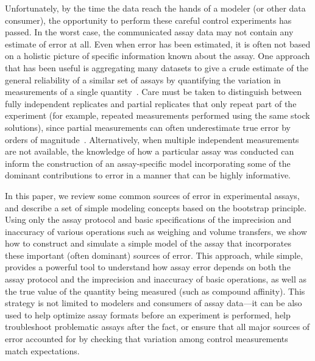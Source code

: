 \documentclass[aps,pre,twocolumn,nofootinbib,superscriptaddress,linenumbers]{revtex4-1}
\begin{document}
Unfortunately, by the time the data reach the hands of a modeler (or other data consumer), the opportunity to perform these careful control experiments has passed.
In the worst case, the communicated assay data may not contain any estimate of error at all. 
Even when error has been estimated, it is often not based on a holistic picture of specific information known about the assay.
One approach that has been useful is aggregating many datasets to give a crude estimate of the general reliability of a similar set of assays by quantifying the variation in measurements of a single quantity~\cite{kramer_experimental_2012,kalliokoski_comparability_2013}. 
Care must be taken to distinguish between fully independent replicates and partial replicates that only repeat part of the experiment (for example, repeated measurements performed using the same stock solutions), since partial measurements can often underestimate true error by orders of magnitude~\cite{chodera_entropy-enthalpy_2013}.
Alternatively, when multiple independent measurements are not available, the knowledge of how a particular assay was conducted can inform the construction of an assay-specific model incorporating some of the dominant contributions to error in a manner that can be highly informative.

In this paper, we review some common sources of error in experimental assays, and describe a set of simple modeling concepts based on the bootstrap principle.
Using only the assay protocol and basic specifications of the imprecision and inaccuracy of various operations such as weighing and volume transfers, we show how to construct and simulate a simple model of the assay that incorporates these important (often dominant) sources of error. 
This approach, while simple, provides a powerful tool to understand how assay error depends on both the assay protocol and the imprecision and inaccuracy of basic operations, as well as the true value of the quantity being measured (such as compound affinity). 
This strategy is not limited to modelers and consumers of assay data---it can be also used to help optimize assay formats before an experiment is performed, help troubleshoot problematic assays after the fact, or ensure that all major sources of error accounted for by checking that variation among control measurements match expectations.
\end{document}
